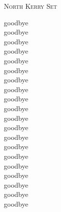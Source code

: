 \begin{center}
\textsc{North Kerry Set} \\
\end{center}

goodbye\\
goodbye\\
goodbye\\
goodbye\\
goodbye\\
goodbye\\
goodbye\\
goodbye\\
goodbye\\
goodbye\\
goodbye\\
goodbye\\
goodbye\\
goodbye\\
goodbye\\
goodbye\\
goodbye\\
goodbye\\
goodbye\\
goodbye\\
